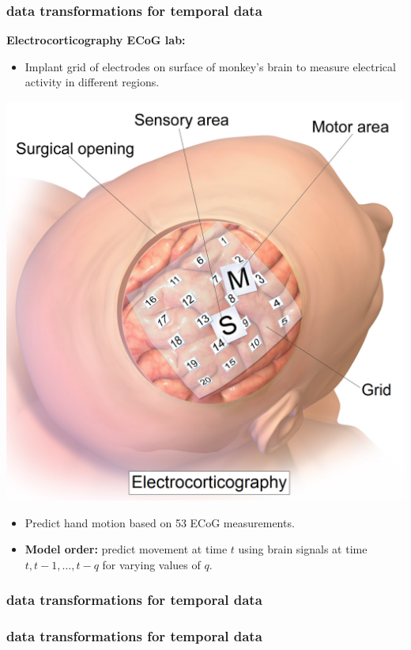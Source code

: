 \documentclass[handout,compress]{beamer}
\begin{document}
\begin{frame}[t]
	\frametitle{data transformations for temporal data}
	\textbf{Electrocorticography ECoG lab:}
	\begin{itemize}
		\item Implant grid of electrodes on surface of monkey's brain to measure electrical activity in different regions. 
	\end{itemize} 
	\begin{center}
		\includegraphics[width=.3\textwidth]{eocg.png}
	\end{center}
	\begin{itemize}
		\item Predict hand motion based on 53 ECoG measurements.
		\item \textbf{Model order:} predict movement at time $t$ using brain signals at time $t,t-1, \ldots, t-q$ for varying values of $q$. 
	\end{itemize} 
\end{frame}

\begin{frame}[t]
	\frametitle{data transformations for temporal data}
\end{frame}

\begin{frame}[t]
	\frametitle{data transformations for temporal data}
\end{frame}
\end{document}
